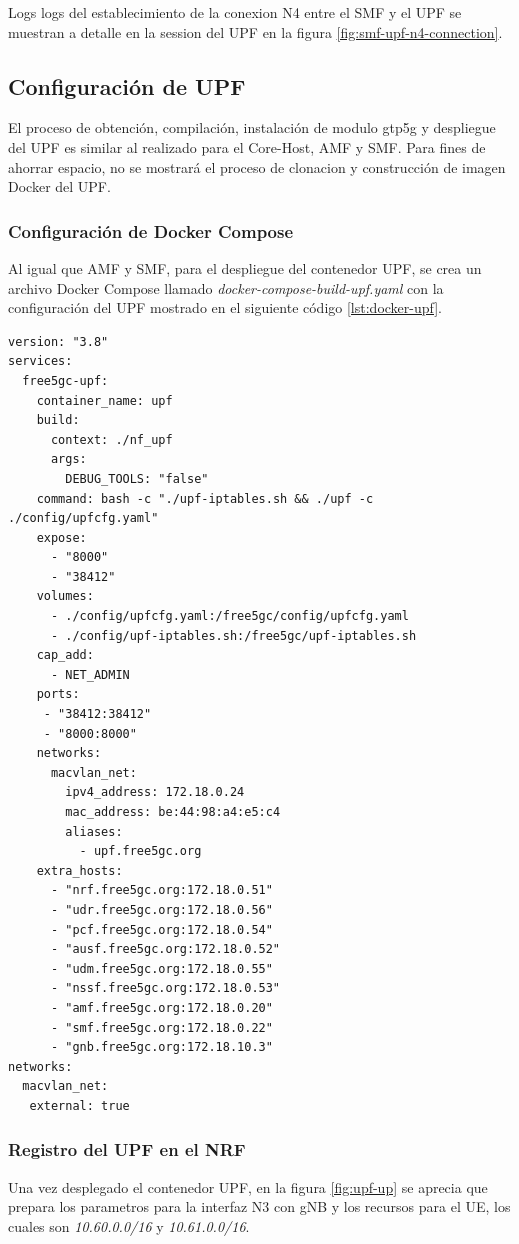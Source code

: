 Logs logs del establecimiento de la conexion N4 entre el SMF y el UPF se muestran a detalle en la session del UPF en la figura \ref{fig:smf-upf-n4-connection}.






\subsection{Configuración de UPF}
El proceso de obtención, compilación, instalación de modulo gtp5g y despliegue del UPF es similar al realizado para el Core-Host, AMF y SMF. Para fines de ahorrar espacio, no se mostrará el proceso de clonacion y construcción de imagen Docker del UPF.
\subsubsection{Configuración de Docker Compose}
Al igual que AMF y SMF, para el despliegue del contenedor UPF, se crea un archivo Docker Compose llamado \textit{docker-compose-build-upf.yaml} con la configuración del UPF mostrado en el siguiente código \ref{lst:docker-upf}.
\begin{lstlisting}[style=yamlstyle, caption={Configuración del Docker Compose UPF}, label=lst:docker-upf]
version: "3.8"
services:
  free5gc-upf:
    container_name: upf
    build:
      context: ./nf_upf
      args:
        DEBUG_TOOLS: "false"
    command: bash -c "./upf-iptables.sh && ./upf -c ./config/upfcfg.yaml"
    expose:
      - "8000"
      - "38412"
    volumes:
      - ./config/upfcfg.yaml:/free5gc/config/upfcfg.yaml
      - ./config/upf-iptables.sh:/free5gc/upf-iptables.sh
    cap_add:
      - NET_ADMIN
    ports:
     - "38412:38412"
     - "8000:8000"
    networks:
      macvlan_net:
        ipv4_address: 172.18.0.24
        mac_address: be:44:98:a4:e5:c4
        aliases:
          - upf.free5gc.org
    extra_hosts:
      - "nrf.free5gc.org:172.18.0.51"
      - "udr.free5gc.org:172.18.0.56"
      - "pcf.free5gc.org:172.18.0.54"
      - "ausf.free5gc.org:172.18.0.52"
      - "udm.free5gc.org:172.18.0.55"
      - "nssf.free5gc.org:172.18.0.53"
      - "amf.free5gc.org:172.18.0.20"
      - "smf.free5gc.org:172.18.0.22"
      - "gnb.free5gc.org:172.18.10.3"
networks:
  macvlan_net:
   external: true

\end{lstlisting}
\subsubsection{Registro del UPF en el NRF}
Una vez desplegado el contenedor UPF, en la figura \ref{fig:upf-up} se aprecia que prepara los parametros para la interfaz N3 con gNB y los recursos para el UE, los cuales son \textit{10.60.0.0/16} y \textit{10.61.0.0/16}.

